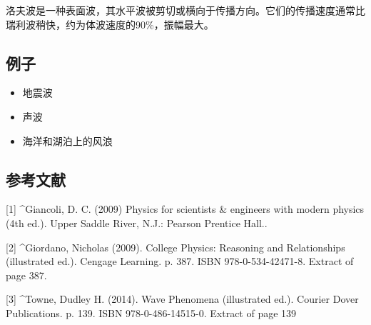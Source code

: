 洛夫波是一种表面波，其水平波被剪切或横向于传播方向。它们的传播速度通常比瑞利波稍快，约为体波速度的90\%，振幅最大。
\subsection{例子}
\begin{itemize}
\item 地震波
\item 声波
\item 海洋和湖泊上的风浪
\end{itemize}
\subsection{参考文献}
[1]
^Giancoli, D. C. (2009) Physics for scientists & engineers with modern physics (4th ed.). Upper Saddle River, N.J.: Pearson Prentice Hall..

[2]
^Giordano, Nicholas (2009). College Physics: Reasoning and Relationships (illustrated ed.). Cengage Learning. p. 387. ISBN 978-0-534-42471-8. Extract of page 387.

[3]
^Towne, Dudley H. (2014). Wave Phenomena (illustrated ed.). Courier Dover Publications. p. 139. ISBN 978-0-486-14515-0. Extract of page 139